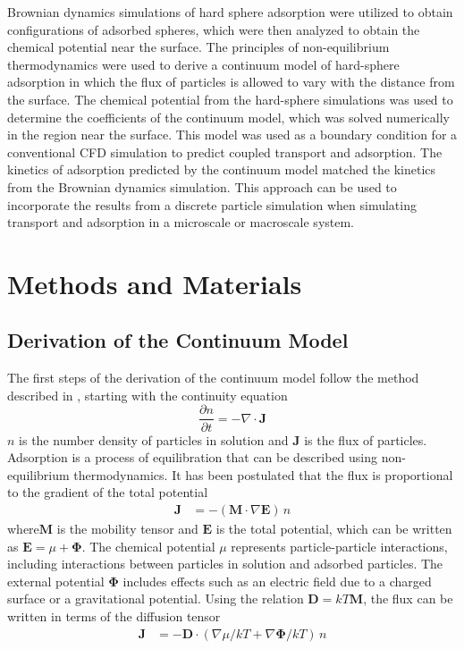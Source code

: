 Brownian dynamics simulations of hard sphere adsorption were utilized
to obtain configurations of adsorbed spheres, which were then analyzed
to obtain the chemical potential near the surface. The principles
of non-equilibrium thermodynamics were used to derive a continuum
model of hard-sphere adsorption in which the flux of particles is
allowed to vary with the distance from the surface. The chemical potential
from the hard-sphere simulations was used to determine the coefficients
of the continuum model, which was solved numerically in the region
near the surface. This model was used as a boundary condition for
a conventional CFD simulation to predict coupled transport and adsorption.
The kinetics of adsorption predicted by the continuum model matched
the kinetics from the Brownian dynamics simulation. This approach
can be used to incorporate the results from a discrete particle simulation
when simulating transport and adsorption in a microscale or macroscale
system.


\section{Methods and Materials}


\subsection{Derivation of the Continuum Model }

The first steps of the derivation of the continuum model follow the
method described in \cite{Adamczyk1999a,Adamczyk2000}, starting with
the continuity equation\begin{equation}
\frac{\partial n}{\partial t}=-\nabla\cdot\mathbf{J}\label{eq:Continuity}\end{equation}
$n$ is the number density of particles in solution and $\mathbf{J}$
is the flux of particles. Adsorption is a process of equilibration
that can be described using non-equilibrium thermodynamics. It has
been postulated that the flux is proportional to the gradient of the
total potential \begin{align}
\mathbf{J} & =-\left(\mathbf{M}\cdot\nabla\mathbf{E}\right)\, n\label{eq:Flux ito Mobility}\end{align}
where$\mathbf{M}$ is the mobility tensor and $\mathbf{E}$ is the
total potential, which can be written as $\mathbf{E}=\mu+\mathbf{\Phi}$.
The chemical potential $\mu$ represents particle-particle interactions,
including interactions between particles in solution and adsorbed
particles. The external potential $\mathbf{\Phi}$ includes effects
such as an electric field due to a charged surface or a gravitational
potential. Using the relation $\mathbf{D}=kT\mathbf{M}$, the flux
can be written in terms of the diffusion tensor\begin{align}
\mathbf{J} & =-\mathbf{D}\cdot\left(\nabla\mu/kT+\nabla\mathbf{\Phi}/kT\right)\, n\label{eq:Flux ito Diffusion}\end{align}


